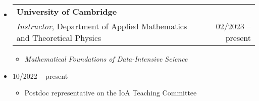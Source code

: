 \documentclass[letterpaper,10pt]{article}
\makeatletter
\newcommand{\subheadingtwolines}[4]{
\begin{tabular*}{6.55in}{l@{\cftdotfill{\cftsecdotsep}\extracolsep{\fill}}r}
#1 & #2 \\
#3 & #4 \\
\end{tabular*}}
\makeatother
\begin{document}
\begin{itemize}[leftmargin=0.4cm]
\item[] \hspace{-2ex}\subheadingtwolines{\bf University of Cambridge}{}{{\it Instructor}, Department of Applied Mathematics and Theoretical Physics}{02/2023 -- present}
\vspace{-0.3cm}
\begin{itemize}[leftmargin=0.4cm, rightmargin=0.3cm]
\item {\it Mathematical Foundations of Data-Intensive Science}
\end{itemize}
\end{itemize}

\vspace{-0.3cm}

\begin{itemize}[leftmargin=0.4cm, rightmargin=0cm]
\item[]  \hfill 10/2022 -- present
\vspace{-0.1cm}
\begin{itemize}[leftmargin=0.4cm, rightmargin=0cm]
\item Postdoc representative on the IoA Teaching Committee
\end{itemize}
\end{itemize}
\end{document}
